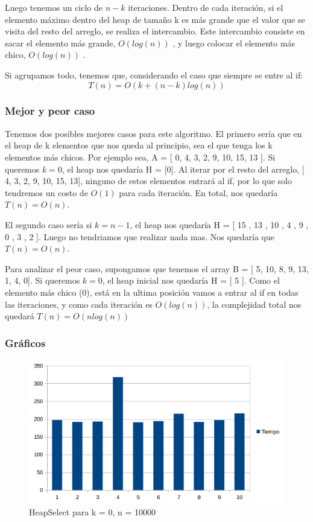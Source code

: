 Luego tenemos un ciclo de $n - k$ iteraciones. Dentro de cada iteración, si el elemento máximo dentro del heap de tamaño k es más grande que el valor que se visita del resto del arreglo, se realiza el intercambio. Este intercambio consiste en sacar el elemento más grande, $O(log(n))$ \cite{STD_POPHEAP}, y luego colocar el elemento más chico, $O(log(n))$ \cite{STD_PUSHHEAP}.

Si agrupamos todo, tenemos que, considerando el caso que siempre se entre al if:
$$ T(n) = O(k + (n-k)log(n)) $$

\subsubsection{Mejor y peor caso}
Tenemos dos posibles mejores casos para este algoritmo.
El primero sería que en el heap de k elementos que nos queda al principio, sea el que tenga los k elementos más chicos. Por ejemplo sea, A = [ 0, 4, 3, 2, 9, 10, 15, 13 ].
Si queremos $k = 0$, el heap nos quedaría H = [0]. Al iterar por el resto del arreglo, [ 4, 3, 2, 9, 10, 15, 13], ninguno de estos elementos entrará al if, por lo que solo tendremos un costo de $O(1)$ para cada iteración.
En total, nos quedaría $T(n) = O(n)$.

El segundo caso sería si $k = n-1$, el heap nos quedaría H = [ 15 , 13 , 10 , 4 , 9 , 0 , 3 , 2 ]. Luego no tendriamos que realizar nada mas. Nos quedaría que $T(n) = O(n)$.

Para analizar el peor caso, supongamos que tenemos el array B = [ 5, 10, 8, 9, 13, 1, 4, 0].
Si queremos $k = 0$, el heap inicial nos quedaría H = [ 5 ]. Como el elemento más chico (0), está en la ultima posición vamos a entrar al if en todas las iteraciones, y como cada iteración es $O(log(n))$, la complejidad total nos quedará $T(n) = O(n log(n))$

\subsubsection{Gráficos}
\begin{figure}[H]
\centering
\includegraphics[width=\textwidth]{KZero/HeapSelectK0.png}
\caption{HeapSelect para k = 0, n = 10000}
\end{figure}

